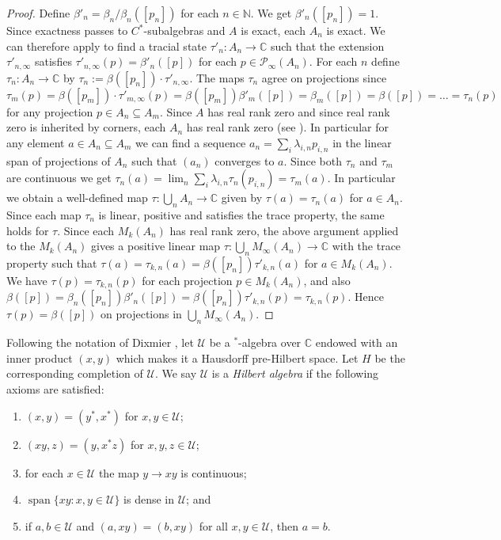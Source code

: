 \documentclass[a4paper, 12pt]{amsart}
\numberwithin{equation}{section}
\theoremstyle{remark}
\theoremstyle{definition}
\begin{document}
\begin{proof}
Define $\beta'_n = \beta_n/\beta_n([p_n])$ for each $n\in {\mathbb{N}}$. We get $\beta'_n([p_n]) =
1$. Since exactness passes to $C^*$-subalgebras and $A$ is exact, each $A_n$ is exact.
We can therefore apply \cite[Corollary 3.4]{MR1190414} to find a tracial state $\tau'_n
\colon A_n \to {\mathbb{C}}$ such that the extension $\tau'_{n,\infty}$ satisfies $\tau'_{n,\infty}(p) = \beta'_n([p])$ for each $p\in
{\mathcal{P}}_\infty(A_n)$. For each $n$ define $\tau_n\colon A_n\to {\mathbb{C}}$ by $\tau_n:= \beta([p_n])\cdot \tau'_{n,\infty}$.
The maps $\tau_n$ agree on projections since
\[
\tau_m(p)
    =\beta([p_m])\cdot \tau'_{m,\infty}(p)
    =\beta([p_m])\beta'_m([p])
    =\beta_m([p])
    =\beta([p])
    =\dots
    =\tau_n(p)
\]
for any projection $p\in A_n\subseteq A_m$. Since $A$ has real rank zero and since real
rank zero is inherited by corners, each $A_n$ has real rank zero (see
\cite[Theorem~2.5]{MR1120918}). In particular for any element $a\in A_n\subseteq A_m$ we
can find a sequence $a_n=\sum_i\lambda_{i,n}p_{i,n}$ in the linear span of projections of
$A_n$ such that $(a_n)$ converges to $a$. Since both $\tau_n$ and $\tau_m$ are continuous
we get $\tau_n(a)=\lim_n \sum_i\lambda_{i,n}\tau_n(p_{i,n})=\tau_m(a)$. In particular we
obtain a well-defined map $\tau\colon \bigcup_n A_n\to {\mathbb{C}}$ given by $\tau(a)=\tau_n(a)$
for $a\in A_n$. Since each map $\tau_n$ is linear, positive and satisfies the trace
property, the same holds for $\tau$. Since each $M_k(A_n)$ has real rank zero, the above
argument applied to the $M_k(A_n)$ gives a positive linear map $\tau\colon \bigcup_n
M_\infty(A_n)\to {\mathbb{C}}$ with the trace property such that
$\tau(a)=\tau_{k,n}(a)=\beta([p_n])\tau'_{k,n}(a)$ for $a\in M_k(A_n)$.
We have $\tau(p)=\tau_{k,n}(p)$ for each projection $p\in M_k(A_n)$, and also
$\beta([p])=\beta_n([p_n])\beta'_n([p])=\beta([p_n])\tau'_{k,n}(p)=\tau_{k,n}(p)$.
Hence $\tau(p)=\beta([p])$ on projections in $\bigcup_nM_\infty(A_n)$.
\end{proof}

Following the notation of Dixmier \cite[p.~77]{MR641217}, let ${\mathcal{U}}$ be a $^*$-algebra
over ${\mathbb{C}}$ endowed with an inner product $(x,y)$ which makes it a Hausdorff pre-Hilbert
space. Let $H$ be the corresponding completion of ${\mathcal{U}}$. We say ${\mathcal{U}}$ is a \emph{Hilbert
algebra} if the following axioms are satisfied:
\begin{enumerate}
	\item\label{H.algebra.i}$(x, y)=(y^*,x^*)$ for $x,y\in {\mathcal{U}}$;
	\item\label{H.algebra.ii}$(xy, z)=(y,x^*z)$ for $x,y,z\in {\mathcal{U}}$;
	\item\label{H.algebra.iii}for each $x\in {\mathcal{U}}$ the map $y\to xy$ is continuous;
	\item\label{H.algebra.iv}${\operatorname{span}}\{xy : x,y \in {\mathcal{U}}\}$ is dense in ${\mathcal{U}}$; and
	\item\label{H.algebra.v}if $a,b \in {\mathcal{U}}$ and $(a,xy)=(b,xy)$ for all $x,y\in {\mathcal{U}}$, then $a=b$.
\end{enumerate}
\end{document}
